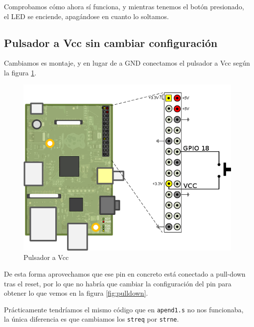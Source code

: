 Comprobamos cómo ahora sí funciona, y mientras tenemos el botón presionado,
el LED se enciende, apagándose en cuanto lo soltamos.

\subsection{Pulsador a Vcc sin cambiar configuración}

Cambiamos es montaje, y en lugar de a GND conectamos el pulsador a Vcc según
la figura \ref{fig:circuito2}.

\begin{figure}[h]
  \centering
    \includegraphics[width=14cm]{graphs/circuito2.png}
  \caption{Pulsador a Vcc}
  \label{fig:circuito2}
\end{figure}

De esta forma aprovechamos que ese pin en concreto está conectado a pull-down tras
el reset, por lo que no habría que cambiar la configuración del pin para obtener
lo que vemos en la figura \ref{fig:pulldown}.

Prácticamente tendríamos el mismo código que en {\tt apend1.s} no nos funcionaba,
la única diferencia es que cambiamos los {\tt streq} por {\tt strne}.

